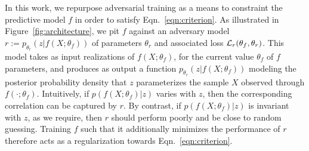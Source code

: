 \documentclass[twocolumn,superscriptaddress,aps]{revtex4-1}
\theoremstyle{plain}
\begin{document}
\begin{figure*}

    \caption{Architecture for the adversarial training of a binary classifier
    $f$ against a continuous parameter $Z$.}
    \label{fig:architecture}
    \end{figure*}

In this work, we repurpose adversarial training as a means to constraint the
predictive model $f$ in order to satisfy Eqn.~\ref{eqn:criterion}. As
illustrated in Figure~\ref{fig:architecture}, we pit $f$ against an adversary
model $r := p_{\theta_r}(z | f(X;\theta_f))$ of parameters $\theta_r$ and
associated loss ${\cal L}_r(\theta_f, \theta_r)$. This model takes  as input
realizations of $f(X; \theta_f)$, for the current value $\theta_f$ of $f$
parameters, and produces as output a function $p_{\theta_r}(z | f(X;\theta_f))$
modeling the posterior probability density that $z$ parameterizes the sample $X$
observed through $f(\cdot;\theta_f)$.
Intuitively, if $p(f(X; \theta_f)|z)$ varies with $z$,
then the corresponding correlation can be captured by $r$. By contrast, if
$p(f(X; \theta_f)|z)$ is invariant with $z$, as we require, then $r$ should
perform poorly and be close to random guessing. Training $f$ such that it
additionally minimizes the performance of $r$ therefore acts as a regularization
towards Eqn.~\ref{eqn:criterion}.
\end{document}

